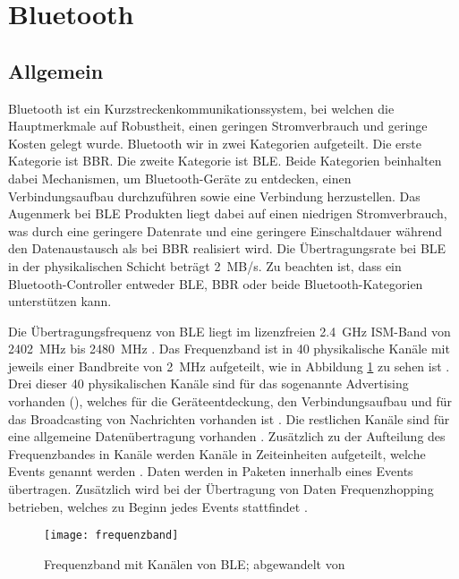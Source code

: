 \section{Bluetooth}

\subsection{Allgemein}

Bluetooth ist ein Kurzstreckenkommunikationssystem, bei welchen die Hauptmerkmale auf Robustheit, einen geringen Stromverbrauch und geringe Kosten gelegt wurde. Bluetooth wir in zwei Kategorien aufgeteilt. Die erste Kategorie ist \ac{BBR}. Die zweite Kategorie ist \ac{BLE}. Beide Kategorien beinhalten dabei Mechanismen, um Bluetooth-Geräte zu entdecken, einen Verbindungsaufbau durchzuführen sowie eine Verbindung herzustellen. Das Augenmerk bei \ac{BLE} Produkten liegt dabei auf einen niedrigen Stromverbrauch, was durch eine geringere Datenrate und eine geringere Einschaltdauer während den Datenaustausch als bei \ac{BBR} realisiert wird. Die Übertragungsrate bei \ac{BLE} in der physikalischen Schicht beträgt 2~MB/s. Zu beachten ist, dass ein Bluetooth-Controller entweder \ac{BLE}, \ac{BBR} oder beide Bluetooth-Kategorien unterstützen kann. \cite[S.~187]{bluetoothCore}

Die Übertragungsfrequenz von \ac{BLE} liegt im lizenzfreien 2.4~GHz \acf{ISM}-Band von 2402~MHz bis 2480~MHz \cites[S.~4]{siliconBLE}[S.~190]{bluetoothCore}. Das Frequenzband ist in 40 physikalische Kanäle mit jeweils einer Bandbreite von 2~MHz aufgeteilt, wie in Abbildung \ref{fig:frequenzbandBLE} zu sehen ist \cite[S.~190]{bluetoothCore}. Drei dieser 40 physikalischen Kanäle sind für das sogenannte Advertising vorhanden ()\cite[S.~190]{bluetoothCore}, welches für die Geräteentdeckung, den Verbindungsaufbau und für das Broadcasting von Nachrichten vorhanden ist \cite[S.~4]{siliconBLE}. Die restlichen Kanäle sind für eine allgemeine Datenübertragung vorhanden \cite[S.~190]{bluetoothCore}. Zusätzlich zu der Aufteilung des Frequenzbandes in Kanäle werden Kanäle in Zeiteinheiten aufgeteilt, welche Events genannt werden \cite[S.~190]{bluetoothCore}. Daten werden in Paketen innerhalb eines Events übertragen. Zusätzlich wird bei der Übertragung von Daten Frequenzhopping betrieben, welches zu Beginn jedes Events stattfindet \cite[S.~190f.]{bluetoothCore}. 

\begin{figure}[h]
\centering
\texttt{[image: frequenzband]}
\caption{Frequenzband mit Kanälen von \ac{BLE}; abgewandelt von \cite[S.~4]{siliconBLE}}
\label{fig:frequenzbandBLE}
\end{figure}

